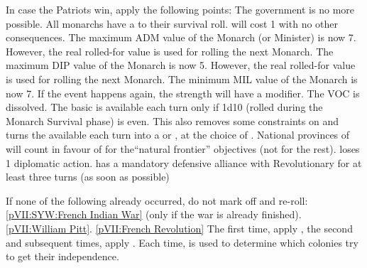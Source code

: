\effetlong
\aparag In case the Patriots win, apply the following points:
\bparag The  government is no more possible.
\bparag All monarchs have a  to their survival roll.  will cost 1 \STAB with no other consequences.
\bparag The maximum ADM value of the Monarch (or Minister) is now 7. However,
the real rolled-for value is used for rolling the next Monarch.
\bparag The maximum DIP value of the Monarch is now 5. However, the real
rolled-for value is used for rolling the next Monarch.
\bparag The minimum MIL value of the Monarch is now 7.
\bparag If the event happens again, the \REVOLT strength will have a
 modifier.
\bparag The VOC is dissolved. The basic \LeaderGov is available each turn only
if 1d10 (rolled during the Monarch Survival phase) is even. This also removes
some constraints on \TFI and turns the \TPaction available each turn into a
\TPaction or \COLaction, at the choice of \HOL.
\bparag National provinces of \HOL will count in favour of \FRA for
the``natural frontier'' objectives (not for the rest).
\bparag \HOL loses 1 diplomatic action.
\bparag \HOL has a mandatory defensive alliance with Revolutionary \FRA for at
least three turns (as soon as possible)




\date{1775-1783}

\condition{}
\aparag If none of the following already occurred, do not mark off and
re-roll:
\bparag \ref{pVII:SYW:French Indian War} (only if the war is already
finished).
\bparag \ref{pVII:William Pitt}.
\bparag \ref{pVII:French Revolution}
\aparag The first time, apply , the second and
subsequent times, apply . Each time,
 is used to determine which colonies try to get their
independence.


